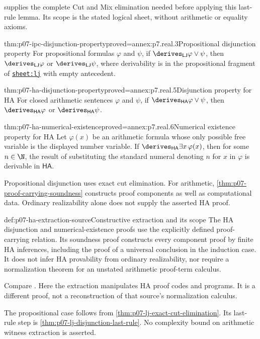  supplies the complete Cut and
Mix elimination needed before applying this last-rule lemma. Its scope
is the stated logical sheet, without arithmetic or equality axioms.

\begin{hbtheorem}{thm:p07-ipc-disjunction-property}{proved=annex:p7.real.3}{Propositional disjunction property}
For propositional formulas \(\varphi\) and \(\psi\), if
\(\derives_{\mathsf{LJ}}\varphi\lor\psi\), then
\(\derives_{\mathsf{LJ}}\varphi\) or
\(\derives_{\mathsf{LJ}}\psi\), where derivability is in the propositional
fragment of \hyperref[sheet:lj]{\texttt{sheet:lj}} with empty antecedent.
\end{hbtheorem}

\begin{hbtheorem}{thm:p07-ha-disjunction-property}{proved=annex:p7.real.5}{Disjunction property for HA}
For closed arithmetic sentences \(\varphi\) and \(\psi\), if
\(\derives_{\mathsf{HA}}\varphi\lor\psi\), then
\(\derives_{\mathsf{HA}}\varphi\) or
\(\derives_{\mathsf{HA}}\psi\).
\end{hbtheorem}

\begin{hbtheorem}{thm:p07-ha-numerical-existence}{proved=annex:p7.real.6}{Numerical existence property for HA}
Let \(\varphi(x)\) be an arithmetic formula whose only possible free variable is
the displayed number variable.  If
\(\derives_{\mathsf{HA}}\exists x\,\varphi(x)\), then for some \(n\in\N\),
the result of substituting the standard numeral denoting \(n\) for \(x\) in
\(\varphi\) is derivable in \(\mathsf{HA}\).
\end{hbtheorem}

Propositional disjunction uses exact cut elimination. For arithmetic,
\cref{thm:p07-proof-carrying-soundness} constructs proof components as
well as computational data. Ordinary realizability alone does not
supply the asserted HA proof.

\begin{hbconvention}{def:p07-ha-extraction-source}{Constructive extraction and its scope}
The HA disjunction and numerical-existence proofs use the explicitly
defined proof-carrying relation. Its soundness proof constructs every
component proof by finite HA inferences, including the proof of a
universal conclusion in the induction case. It does not infer HA
provability from ordinary realizability, nor require a normalization
theorem for an unstated arithmetic proof-term calculus.

Compare \cite[Vol.~I, Chapter~3, \S5.6]{TroelstraVanDalen1988}.
Here the extraction manipulates HA proof codes and programs. It is a
different proof, not a reconstruction of that source's normalization
calculus.

The propositional case follows from
\cref{thm:p07-lj-exact-cut-elimination}. Its last-rule step is
\cref{thm:p07-lj-disjunction-last-rule}. No complexity bound on
arithmetic witness extraction is asserted.
\end{hbconvention}

